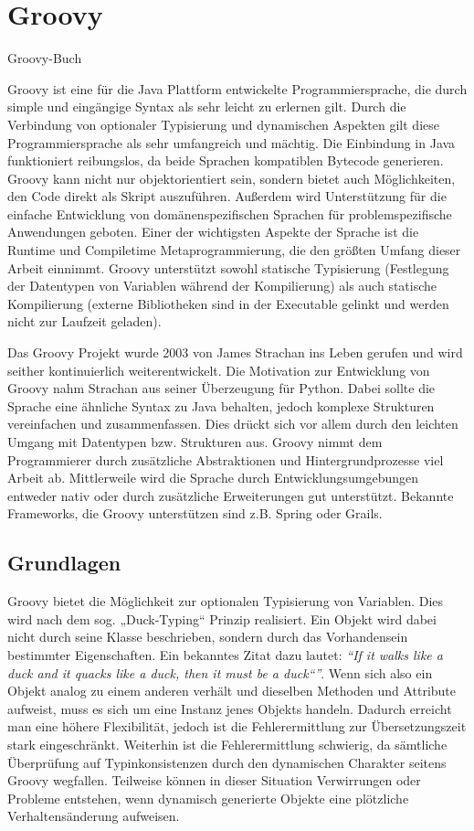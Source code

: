 
\section{Groovy}
\label{ch-groovy}

Groovy-Buch \cite{groovy-in-action}

Groovy ist eine für die Java Plattform entwickelte Programmiersprache, die durch simple und eingängige Syntax als sehr leicht zu erlernen gilt.
Durch die Verbindung von  optionaler Typisierung und dynamischen Aspekten gilt diese Programmiersprache als sehr umfangreich und mächtig. Die Einbindung in Java funktioniert reibungslos, da beide Sprachen kompatiblen Bytecode generieren. Groovy kann nicht nur objektorientiert sein, sondern bietet auch Möglichkeiten, den Code direkt als Skript auszuführen. Außerdem wird Unterstützung für die einfache Entwicklung von domänenspezifischen Sprachen für problemspezifische Anwendungen geboten. Einer der wichtigsten Aspekte der Sprache ist die Runtime und Compiletime Metaprogrammierung, die den größten Umfang dieser Arbeit einnimmt. 
Groovy unterstützt sowohl statische Typisierung (Festlegung der Datentypen von Variablen während der Kompilierung) als auch statische Kompilierung (externe Bibliotheken sind in der Executable gelinkt und werden nicht zur Laufzeit geladen). 

Das Groovy Projekt wurde 2003 von James Strachan ins Leben gerufen und wird seither kontinuierlich weiterentwickelt.
Die Motivation zur Entwicklung von Groovy nahm Strachan aus seiner Überzeugung für Python. Dabei sollte die Sprache eine ähnliche Syntax zu Java behalten, jedoch komplexe Strukturen vereinfachen und zusammenfassen. Dies drückt sich vor allem durch den leichten Umgang mit Datentypen bzw. Strukturen aus. Groovy nimmt dem Programmierer durch zusätzliche Abstraktionen und Hintergrundprozesse viel Arbeit ab. Mittlerweile wird die Sprache durch Entwicklungsumgebungen entweder nativ oder durch zusätzliche Erweiterungen gut unterstützt. Bekannte Frameworks, die Groovy unterstützen sind z.B. Spring oder Grails.

\subsection{Grundlagen}
Groovy bietet die Möglichkeit zur optionalen Typisierung von Variablen. Dies wird nach dem sog. „Duck-Typing“ Prinzip realisiert. Ein Objekt wird dabei nicht durch seine Klasse beschrieben, sondern durch das Vorhandensein bestimmter Eigenschaften. Ein bekanntes Zitat dazu lautet: \textit{\enquote{If it walks like a duck and it quacks like a duck, then it must be a duck“}}. Wenn sich also ein Objekt analog zu einem anderen verhält und dieselben Methoden und Attribute aufweist, muss es sich um eine Instanz jenes Objekts handeln. Dadurch erreicht man eine höhere Flexibilität, jedoch ist die Fehlerermittlung zur Übersetzungszeit stark eingeschränkt.
Weiterhin ist die Fehlerermittlung schwierig, da sämtliche Überprüfung auf Typinkonsistenzen durch den dynamischen Charakter seitens Groovy wegfallen.
Teilweise können in dieser Situation Verwirrungen oder Probleme entstehen, wenn dynamisch generierte Objekte eine plötzliche Verhaltensänderung aufweisen. 

